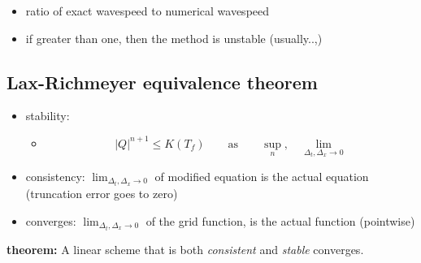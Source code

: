 \documentclass[
]{article}
\providecommand{\tightlist}{%
  \setlength{\itemsep}{0pt}\setlength{\parskip}{0pt}}
\begin{document}
\begin{itemize}
\tightlist
\item
  ratio of exact wavespeed to numerical wavespeed
\item
  if greater than one, then the method is unstable (usually..,)
\end{itemize}

\hypertarget{lax-richmeyer-equivalence-theorem}{%
\subsection{Lax-Richmeyer equivalence
theorem}\label{lax-richmeyer-equivalence-theorem}}

\begin{itemize}
\item
  stability:

  \begin{itemize}
  \tightlist
  \item
    \[ |Q|^{n+1} \leq K(T_f) \qquad \text{as} \qquad \sup_n,  \quad \lim_{\Delta_t, \Delta_x \to 0} \]
  \end{itemize}
\item
  consistency: \(\lim_{\Delta_t, \Delta_x \to 0}\) of modified equation
  is the actual equation (truncation error goes to zero)
\item
  converges: \(\lim_{\Delta_t, \Delta_x \to 0}\) of the grid function,
  is the actual function (pointwise)
\end{itemize}

\textbf{theorem:} A linear scheme that is both \emph{consistent} and
\emph{stable} converges.

\printbibliography
\end{document}
